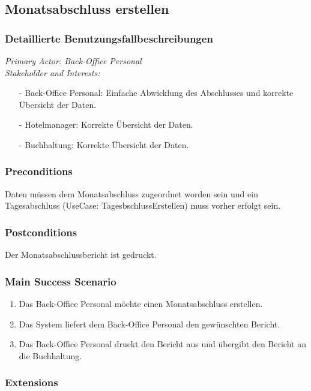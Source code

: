 \documentclass[./detailed_overview_usecases.tex]{subfiles}
\begin{document}
    \subsection{Monatsabschluss erstellen}
    \subsubsection{Detaillierte Benutzungsfallbeschreibungen}
    \textit{Primary Actor: Back-Office Personal}
    \\
    \textit{Stakeholder and Interests:}
    \begin{itemize}
        \item[-] Back-Office Personal: Einfache Abwicklung des Abschlusses und korrekte Übersicht der Daten.
        \item[-] Hotelmanager: Korrekte Übersicht der Daten.
        \item[-] Buchhaltung: Korrekte Übersicht der Daten.
    \end{itemize}

    \subsubsection*{Preconditions}
    Daten müssen dem Monatsabschluss zugeordnet worden sein und ein Tagesabschluss (UseCase: TagesbschlussErstellen) muss vorher erfolgt sein.
    \subsubsection*{Postconditions}
    Der Monatsabschlussbericht ist gedruckt.

    \subsubsection*{Main Success Scenario}
    \begin{enumerate}
        \item Das Back-Office Personal möchte einen Monatsabschluss erstellen.
        \item Das System liefert dem Back-Office Personal den gewünschten Bericht.
        \item Das Back-Office Personal druckt den Bericht aus und übergibt den Bericht an die Buchhaltung.
    \end{enumerate}

    \subsubsection*{Extensions}
\end{document}
